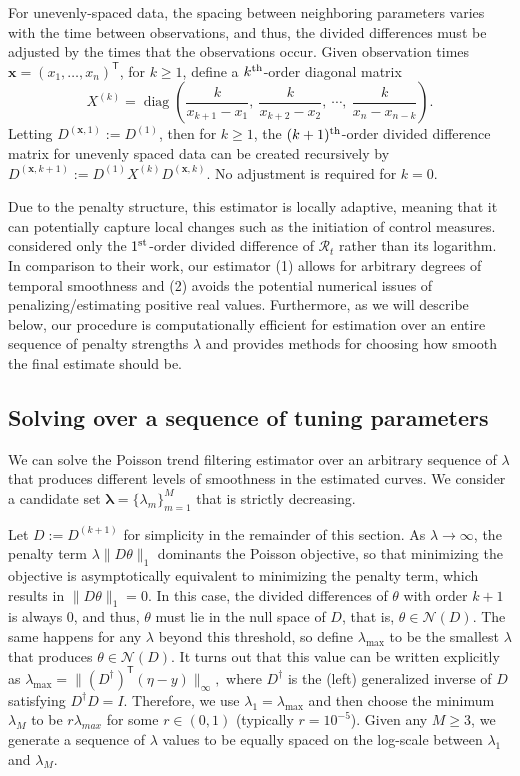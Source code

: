 \documentclass[10pt,letterpaper]{article}
\newcommand{\lr}[1]{\left(#1\right)}
\newcommand{\snorm}[1]{\lVert #1 \rVert}
\DeclareMathOperator*{\diag}{diag}
\def\bfx{\mathbf{x}}
\def\calR{\mathcal{R}}
\renewcommand{\top}{\mathsf{T}}
\def\th{^{\textnormal{th}}}
\def\first{$1^{\textnormal{st}}$}
\begin{document}
For unevenly-spaced data, the spacing between neighboring parameters
varies with the time between observations, and thus, the divided differences
must be adjusted by the times that the observations occur. Given observation
times $\bfx = {(x_1,\dots,x_n)}^\top$, for $k \geq 1$, define a $k\th$-order
diagonal matrix $$X^{(k)} = \diag \lr{\frac{k}{x_{k+1} - x_1},\ \frac{k}{x_{k+2}
- x_2},\ \cdots,\ \frac{k}{x_n - x_{n-k}} }.$$ Letting $D^{(\bfx,1)} := D^{(1)}$,
then for $k\geq 1$, the $(k+1)\th$-order divided difference matrix for unevenly
spaced data can be created recursively by
$D^{(\bfx, k+1)} := D^{(1)} X^{(k)} D^{(\bfx,k)}.$ No adjustment is required
for $k=0$. 


Due to the penalty structure, this estimator is locally adaptive,
meaning that it can potentially capture local changes such as the initiation of
control measures. \cite{abry2020spatial,pascal2022nonsmooth} considered only the
\first-order divided difference of $\calR_t$ rather than its logarithm. In
comparison to their work, our estimator (1) allows for arbitrary degrees of
temporal smoothness and (2) avoids the potential numerical issues of
penalizing/estimating positive real values. Furthermore, as we will describe
below, our procedure is computationally efficient for estimation over an entire
sequence of penalty strengths $\lambda$ and provides methods for choosing how
smooth the final estimate should be.


\subsection{Solving over a sequence of tuning parameters}
\label{sec:candidate-set}

We can solve the Poisson trend filtering estimator over an arbitrary sequence of 
$\lambda$ that produces different levels of smoothness in the estimated curves. 
We consider a candidate set $\boldsymbol{\lambda} = \{\lambda_m\}_{m=1}^M$
that is strictly decreasing.


Let $D := D^{(k+1)}$ for simplicity in the remainder of this section. As
$\lambda \to\infty$, the penalty term $\lambda \snorm{D\theta}_1$ dominants the
Poisson objective, so that minimizing the objective is asymptotically equivalent
to minimizing the penalty term, which results in $\snorm{D\theta}_1 = 0$. In
this case, the divided differences of $\theta$ with order $k+1$ is always $0$,
and thus, $\theta$ must lie in the null space of $D$, that is,
$\theta\in\mathcal{N}(D)$. The same happens for any $\lambda$ beyond this
threshold, so define $\lambda_{\textrm{max}}$ to be the smallest $\lambda$ that
produces $\theta\in\mathcal{N}(D)$. It turns out that this value can be written
explicitly as $\lambda_{\textrm{max}} = \snorm{\lr{D^{\dagger}}^{\top} \lr{\eta
- y}}_{\infty},$ where $D^{\dagger}$ is the (left) generalized inverse of $D$
satisfying $D^{\dagger} D = I$. Therefore, we use $\lambda_1 =
\lambda_{\textrm{max}}$ and then choose the minimum $\lambda_M$ to be
$r\lambda_{max}$ for some $r \in (0,1)$ (typically $r=10^{-5}$). Given any
$M\geq 3$, we generate a sequence of $\lambda$ values to be equally spaced on
the log-scale between $\lambda_1$ and $\lambda_M$. 
\end{document}
